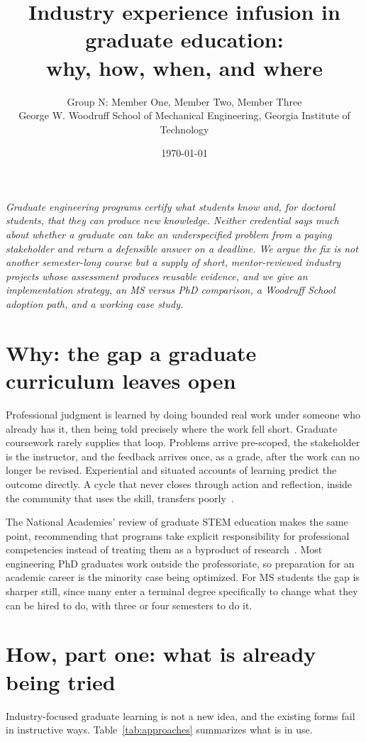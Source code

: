 \documentclass[10pt,letterpaper]{article}
\title{\vspace{-3.5ex}\textbf{Industry experience infusion in graduate education:\\ why, how, when, and where}}
\author{\normalsize Group N: Member One, Member Two, Member Three\\[-0.4ex]
        \small George W. Woodruff School of Mechanical Engineering, Georgia Institute of Technology}
\date{\vspace{-1.5ex}\small\today}
\begin{document}
\maketitle
\vspace{-3ex}

\noindent\textit{Graduate engineering programs certify what students know and, for doctoral students,
that they can produce new knowledge. Neither credential says much about whether a graduate can take an
underspecified problem from a paying stakeholder and return a defensible answer on a deadline. We argue
the fix is not another semester-long course but a supply of short, mentor-reviewed industry projects
whose assessment produces reusable evidence, and we give an implementation strategy, an MS versus PhD
comparison, a Woodruff School adoption path, and a working case study.}

\section{Why: the gap a graduate curriculum leaves open}

Professional judgment is learned by doing bounded real work under someone who already has it, then
being told precisely where the work fell short. Graduate coursework rarely supplies that loop.
Problems arrive pre-scoped, the stakeholder is the instructor, and the feedback arrives once, as a
grade, after the work can no longer be revised. Experiential and situated accounts of learning predict
the outcome directly. A cycle that never closes through action and reflection, inside the community
that uses the skill, transfers poorly~\cite{kolb1984,lave1991,collins1989}.

The National Academies' review of graduate STEM education makes the same point, recommending that
programs take explicit responsibility for professional competencies instead of treating them as a
byproduct of research~\cite{nas2018}. Most engineering PhD graduates work outside the professoriate, so
preparation for an academic career is the minority case being optimized. For MS students the gap is
sharper still, since many enter a terminal degree specifically to change what they can be hired to do,
with three or four semesters to do it.

\section{How, part one: what is already being tried}

Industry-focused graduate learning is not a new idea, and the existing forms fail in instructive ways.
Table~\ref{tab:approaches} summarizes what is in use.
\end{document}

